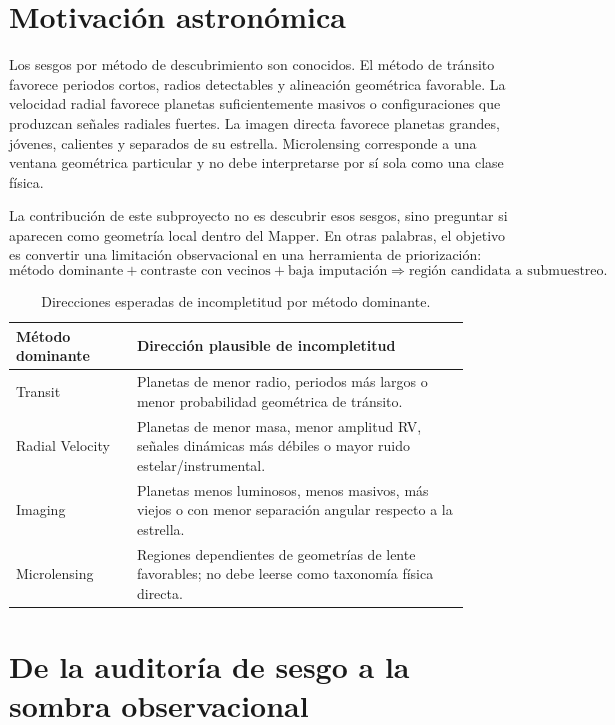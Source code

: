 \documentclass[11pt]{article}
\begin{document}
\section{Motivación astronómica}

Los sesgos por método de descubrimiento son conocidos. El método de tránsito favorece periodos cortos, radios detectables y alineación geométrica favorable. La velocidad radial favorece planetas suficientemente masivos o configuraciones que produzcan señales radiales fuertes. La imagen directa favorece planetas grandes, jóvenes, calientes y separados de su estrella. Microlensing corresponde a una ventana geométrica particular y no debe interpretarse por sí sola como una clase física.

La contribución de este subproyecto no es descubrir esos sesgos, sino preguntar si aparecen como geometría local dentro del Mapper. En otras palabras, el objetivo es convertir una limitación observacional en una herramienta de priorización:
\[
\text{método dominante} + \text{contraste con vecinos} + \text{baja imputación}
\Rightarrow
\text{región candidata a submuestreo}.
\]

\begin{table}[H]
\centering
\small
\caption{Direcciones esperadas de incompletitud por método dominante.}
\label{tab:direcciones}
\begin{tabular}{p{0.24\linewidth}p{0.66\linewidth}}
\toprule
\textbf{Método dominante} & \textbf{Dirección plausible de incompletitud} \\
\midrule
Transit & Planetas de menor radio, periodos más largos o menor probabilidad geométrica de tránsito. \\
Radial Velocity & Planetas de menor masa, menor amplitud RV, señales dinámicas más débiles o mayor ruido estelar/instrumental. \\
Imaging & Planetas menos luminosos, menos masivos, más viejos o con menor separación angular respecto a la estrella. \\
Microlensing & Regiones dependientes de geometrías de lente favorables; no debe leerse como taxonomía física directa. \\
\bottomrule
\end{tabular}
\end{table}

\section{De la auditoría de sesgo a la sombra observacional}
\end{document}
